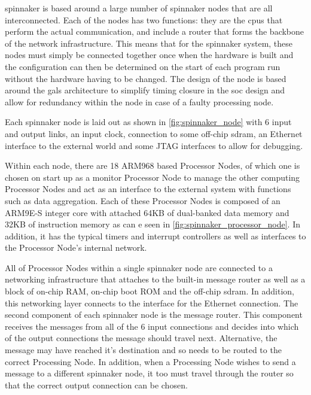 \documentclass[paper=a4, fontsize=11pt, bibliography=totocnumbered]{scrartcl}
\numberwithin{equation}{section}		%
\numberwithin{figure}{section}			%
\numberwithin{table}{section}				%
\begin{document}
\Gls{spinnaker} is based around a large number of \gls{spinnaker} nodes that are all interconnected. Each of the nodes has two functions: they are the \glspl{cpu} that perform the actual communication, and include a router that forms the backbone of the network infrastructure. This means that for the \gls{spinnaker} system, these nodes must simply be connected together once when the hardware is built and the configuration can then be determined on the start of each program run without the hardware having to be changed. The design of the node is based around the \gls{gals} architecture\cite{art:1_plana_furber_temple_khan_shi_wu_yang_2007} to simplify timing closure in the \gls{soc} design and allow for redundancy within the node in case of a faulty processing node.

Each \gls{spinnaker} node is laid out as shown in \cref{fig:spinnaker_node} with 6 input and output links, an input clock, connection to some off-chip \gls{sdram}, an Ethernet interface to the external world and some JTAG interfaces to allow for debugging. 

Within each node, there are 18 ARM968 based Processor Nodes, of which one is chosen on start up as a monitor Processor Node to manage the other computing Processor Nodes and act as an interface to the external system with functions such as data aggregation. Each of these Processor Nodes is composed of an ARM9E-S integer core with attached 64KB of dual-banked data memory and 32KB of instruction memory as can e seen in \cref{fig:spinnaker_processor_node}. In addition, it has the typical timers and interrupt controllers as well as interfaces to the Processor Node's internal network.

All of Processor Nodes within a single \gls{spinnaker} node are connected to a networking infrastructure that attaches to the built-in \gls{message} router as well as a block of on-chip RAM, on-chip boot ROM and the off-chip \gls{sdram}. In addition, this networking layer connects to the interface for the Ethernet connection.
The second component of each \gls{spinnaker} node is the \gls{message} router. This component receives the \glspl{message} from all of the 6 input connections and decides into which of the output connections the \gls{message} should travel next. Alternative, the \gls{message} may have reached it's destination and so needs to be routed to the correct Processing Node. In addition, when a Processing Node wishes to send a \gls{message} to a different \gls{spinnaker} node, it too must travel through the router so that the correct output connection can be chosen.
\end{document}
